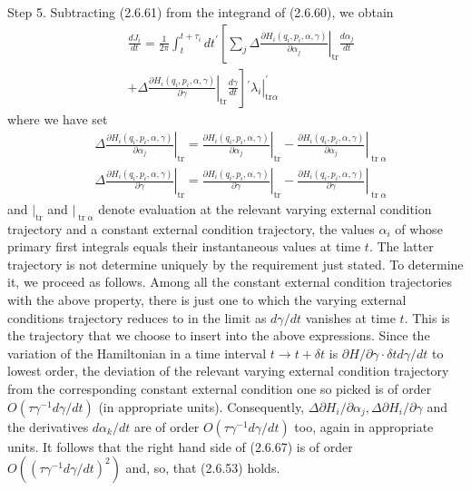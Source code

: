 \documentclass{article}
\begin{document}
Step 5. Subtracting (2.6.61) from the integrand of (2.6.60), we obtain
$$
\begin{align*}
& \frac{d J_{i}}{d t}=\frac{1}{2 \pi} \int_{t}^{t+\tau_{i}} d t^{\prime}\left[\left.\sum_{j} \Delta \frac{\partial H_{i}\left(q_{i}, p_{i}, \alpha, \gamma\right)}{\partial \alpha_{j}}\right|_{\operatorname{tr}} \frac{d \alpha_{j}}{d t}\right.  \tag{2.6.67}\\
&\left.+\left.\Delta \frac{\partial H_{i}\left(q_{i}, p_{i}, \alpha, \gamma\right)}{\partial \gamma}\right|_{\operatorname{tr}} \frac{d \gamma}{d t}\right]\left.^{\prime} \lambda_{i}\right|_{\mathrm{tr} \alpha} ^{\prime}
\end{align*}
$$
where we have set
$$
\begin{align*}
& \left.\Delta \frac{\partial H_{i}\left(q_{i}, p_{i}, \alpha, \gamma\right)}{\partial \alpha_{j}}\right|_{\operatorname{tr}}=\left.\frac{\partial H_{i}\left(q_{i}, p_{i}, \alpha, \gamma\right)}{\partial \alpha_{j}}\right|_{\operatorname{tr}}-\left.\frac{\partial H_{i}\left(q_{i}, p_{i}, \alpha, \gamma\right)}{\partial \alpha_{j}}\right|_{\operatorname{tr} \alpha}  \tag{2.6.68a}\\
& \left.\Delta \frac{\partial H_{i}\left(q_{i}, p_{i}, \alpha, \gamma\right)}{\partial \gamma}\right|_{\operatorname{tr}}=\left.\frac{\partial H_{i}\left(q_{i}, p_{i}, \alpha, \gamma\right)}{\partial \gamma}\right|_{\operatorname{tr}}-\left.\frac{\partial H_{i}\left(q_{i}, p_{i}, \alpha, \gamma\right)}{\partial \gamma}\right|_{\operatorname{tr} \alpha} \tag{2.6.68b}
\end{align*}
$$
and $\left.\right|_{\operatorname{tr}}$ and $\left.\right|_{\operatorname{tr} \alpha}$ denote evaluation at the relevant varying external condition trajectory and a constant external condition trajectory, the values $\alpha_{i}$ of whose primary first integrals equals their instantaneous values at time $t$. The latter trajectory is not determine uniquely by the requirement just stated. To determine it, we proceed as follows. Among all the constant external condition trajectories with the above property, there is just one to which the varying external conditions trajectory reduces to in the limit as $d \gamma / d t$ vanishes at time $t$. This is the trajectory that we choose to insert into the above expressions. Since the variation of the Hamiltonian in a time interval $t \rightarrow t+\delta t$
is $\partial H / \partial \gamma \cdot \delta t d \gamma / d t$ to lowest order, the deviation of the relevant varying external condition trajectory from the corresponding constant external condition one so picked is of order $O\left(\tau \gamma^{-1} d \gamma / d t\right)$ (in appropriate units). Consequently, $\Delta \partial H_{i} / \partial \alpha_{j}, \Delta \partial H_{i} / \partial \gamma$ and the derivatives $d \alpha_{k} / d t$ are of order $O\left(\tau \gamma^{-1} d \gamma / d t\right)$ too, again in appropriate units. It follows that the right hand side of (2.6.67) is of order $O\left(\left(\tau \gamma^{-1} d \gamma / d t\right)^{2}\right)$ and, so, that (2.6.53) holds.
\end{document}
